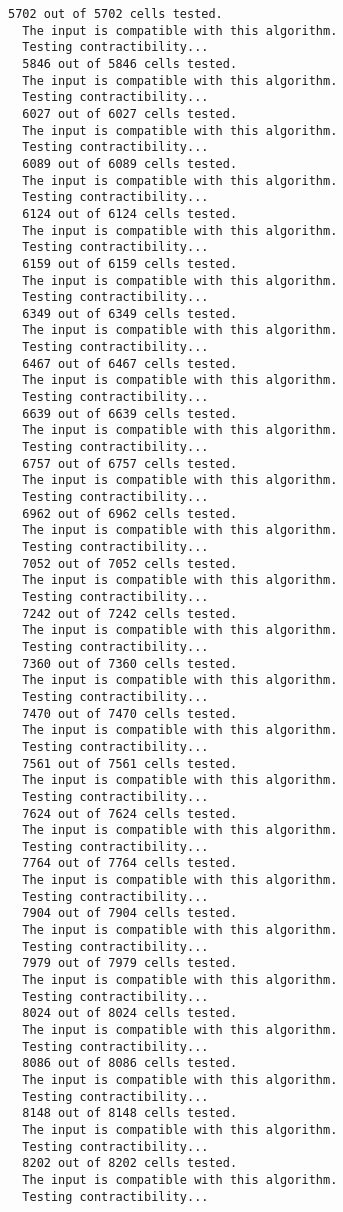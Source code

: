 \documentclass[a4paper,11pt]{report}
\begin{document}
{{\begin{Verbatim}[commandchars=@|B,fontsize=\small,frame=single,label=Example]
  5702 out of 5702 cells tested.
  The input is compatible with this algorithm.
  Testing contractibility...
  5846 out of 5846 cells tested.
  The input is compatible with this algorithm.
  Testing contractibility...
  6027 out of 6027 cells tested.
  The input is compatible with this algorithm.
  Testing contractibility...
  6089 out of 6089 cells tested.
  The input is compatible with this algorithm.
  Testing contractibility...
  6124 out of 6124 cells tested.
  The input is compatible with this algorithm.
  Testing contractibility...
  6159 out of 6159 cells tested.
  The input is compatible with this algorithm.
  Testing contractibility...
  6349 out of 6349 cells tested.
  The input is compatible with this algorithm.
  Testing contractibility...
  6467 out of 6467 cells tested.
  The input is compatible with this algorithm.
  Testing contractibility...
  6639 out of 6639 cells tested.
  The input is compatible with this algorithm.
  Testing contractibility...
  6757 out of 6757 cells tested.
  The input is compatible with this algorithm.
  Testing contractibility...
  6962 out of 6962 cells tested.
  The input is compatible with this algorithm.
  Testing contractibility...
  7052 out of 7052 cells tested.
  The input is compatible with this algorithm.
  Testing contractibility...
  7242 out of 7242 cells tested.
  The input is compatible with this algorithm.
  Testing contractibility...
  7360 out of 7360 cells tested.
  The input is compatible with this algorithm.
  Testing contractibility...
  7470 out of 7470 cells tested.
  The input is compatible with this algorithm.
  Testing contractibility...
  7561 out of 7561 cells tested.
  The input is compatible with this algorithm.
  Testing contractibility...
  7624 out of 7624 cells tested.
  The input is compatible with this algorithm.
  Testing contractibility...
  7764 out of 7764 cells tested.
  The input is compatible with this algorithm.
  Testing contractibility...
  7904 out of 7904 cells tested.
  The input is compatible with this algorithm.
  Testing contractibility...
  7979 out of 7979 cells tested.
  The input is compatible with this algorithm.
  Testing contractibility...
  8024 out of 8024 cells tested.
  The input is compatible with this algorithm.
  Testing contractibility...
  8086 out of 8086 cells tested.
  The input is compatible with this algorithm.
  Testing contractibility...
  8148 out of 8148 cells tested.
  The input is compatible with this algorithm.
  Testing contractibility...
  8202 out of 8202 cells tested.
  The input is compatible with this algorithm.
  Testing contractibility...

\end{Verbatim}}}
\end{document}
